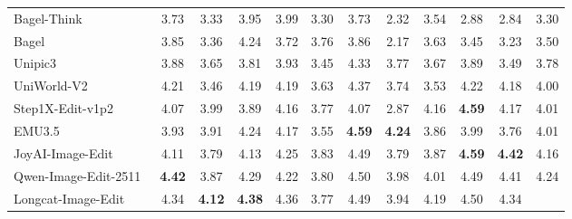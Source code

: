 \begin{table}[t]
{\begin{tabular}{l|cccccccccc|c}
            Bagel-Think~\cite{deng2025emerging}
            & 3.73 & 3.33 & 3.95 & 3.99 & 3.30 & 3.73 & 2.32 & 3.54 & 2.88 & 2.84
            & \cellcolor[HTML]{C8C8C8}3.30 \\

            Bagel~\cite{deng2025emerging}
            & 3.85 & 3.36 & 4.24 & 3.72 & 3.76 & 3.86 & 2.17 & 3.63 & 3.45 & 3.23
            & \cellcolor[HTML]{C8C8C8}3.50 \\

            

            Unipic3~\cite{wei2026skywork}
            & 3.88 & 3.65 & 3.81 & 3.93 & 3.45 & 4.33 & 3.77 & 3.67 & 3.89 & 3.49
            & \cellcolor[HTML]{C8C8C8}3.78 \\

            UniWorld-V2~\cite{li2025uniworld}
            & 4.21 & 3.46 & 4.19 & 4.19 & 3.63 & 4.37 & 3.74 & 3.53 & 4.22 & 4.18
            & \cellcolor[HTML]{C8C8C8}4.00 \\


            Step1X-Edit-v1p2~\cite{liu2025step1x}
            & 4.07 & 3.99 & 3.89 & 4.16 & 3.77 & 4.07 & 2.87 & 4.16 & \color[HTML]{F88825}\textbf{4.59} & 4.17
            & \cellcolor[HTML]{C8C8C8}4.01 \\
            
            EMU3.5~\cite{cui2025emu3}
            & 3.93 & 3.91 & 4.24 & 4.17 & 3.55 &  \color[HTML]{F88825}\textbf{4.59} & \color[HTML]{F88825}\textbf{4.24} & 3.86 & 3.99 & 3.76
            & \cellcolor[HTML]{C8C8C8}4.01 \\

            


            JoyAI-Image-Edit~\cite{joyaiimage2026}
            & 4.11 & 3.79 & 4.13 & 4.25 & 3.83 & 4.49 & 3.79 & 3.87 & \color[HTML]{F88825}\textbf{4.59} & \color[HTML]{F88825}\textbf{4.42}
            & \cellcolor[HTML]{C8C8C8}4.16 \\

            Qwen-Image-Edit-2511~\cite{wu2025qwen}
            & \color[HTML]{F88825}\textbf{4.42} & 3.87 & 4.29 & 4.22 & 3.80 & 4.50 & 3.98 & 4.01 & 4.49 & 4.41
            & \cellcolor[HTML]{C8C8C8}4.24 \\

            Longcat-Image-Edit~\cite{team2025longcat}
            & 4.34 & \color[HTML]{F88825}\textbf{4.12} & \color[HTML]{F88825}\textbf{4.38} & 4.36 & 3.77 & 4.49 & 3.94 & 4.19 & 4.50 & 4.34
            & \cellcolor[HTML]{C8C8C8}{\color[HTML]{F88825}\textbf{4.26}} \\
            \midrule


\end{tabular}}
\end{table}
